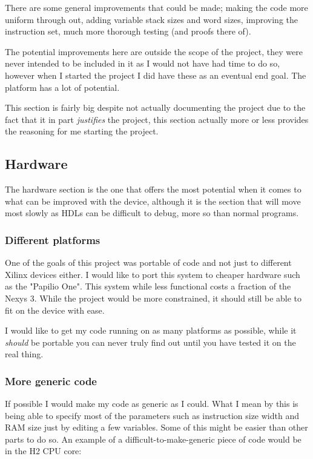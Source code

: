\documentclass	[a4paper, 10pt]	{article}
\begin{document}
    There are some general improvements that could be made; making the code more uniform
    through out, adding variable stack sizes and word sizes, improving the instruction set,
    much more thorough testing (and proofs there of).

    The potential improvements here are outside the scope of the project, they were never
    intended to be included in it as I would not have had time to do so, however when I
    started the project I did have these as an eventual end goal. The platform has a lot of
    potential.

    This section is fairly big despite not actually documenting the project due to the fact
    that it in part \emph{justifies} the project, this section actually more or less provides
    the reasoning for me starting the project.

    \subsection{Hardware}

      The hardware section is the one that offers the most potential when it comes to
      what can be improved with the device, although it is the section that will move
      most slowly as HDLs can be difficult to debug, more so than normal programs.

      \subsubsection{Different platforms}
      One of the goals of this project was portable of code and not just to different
      Xilinx devices either. I would like to port this system to cheaper hardware
      such as the "Papilio One". \cite{papilio} This system while less
      functional costs a fraction of the Nexys 3. While the project would be more
      constrained, it should still be able to fit on the device with ease.

      I would like to get my code running on as many platforms as possible, while it
      \emph{should} be portable you can never truly find out until you have tested
      it on the real thing.

      \subsubsection{More generic code}

        If possible I would make my code as generic as I could. What I mean by this
        is being able to specify most of the parameters such as instruction size
        width and RAM size just by editing a few variables. Some of this might be
        easier than other parts to do so. An example of a difficult-to-make-generic piece of code
        would be in the H2 CPU core:
\end{document}
